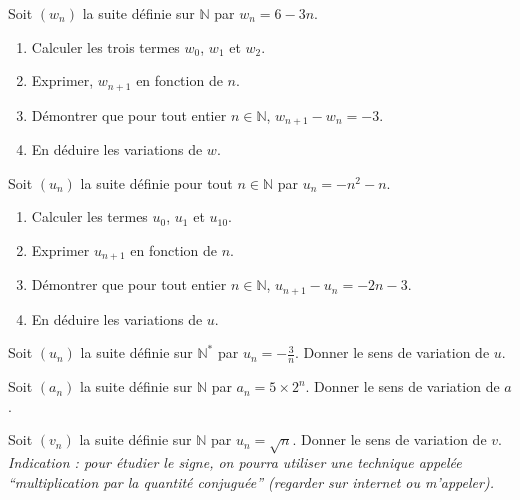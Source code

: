 \documentclass[11pt]{article}
\begin{document}
\noindent\begin{minipage}[]{.48\textwidth}
\begin{exo}
  Soit $(w_n)$ la suite définie sur $\mathbb{N}$ par $w_n = 6 - 3n$.
\begin{enumerate}
    \item Calculer les trois termes $w_0$, $w_1$ et $w_2$.
    \item Exprimer, $w_{n+1}$ en fonction de $n$.
    \item Démontrer que pour tout entier $n \in \mathbb{N}$, $w_{n+1} - w_n = -3$.
    \item En déduire les variations de $w$.
\end{enumerate}
\end{exo}
\end{minipage}
\hfill
\begin{minipage}[]{.48\textwidth}
\begin{exo}
  Soit $(u_n)$ la suite définie pour tout $n \in \mathbb{N}$ par $u_n = -n^2-n$.
\begin{enumerate}
    \item Calculer les termes $u_0$, $u_1$ et $u_{10}$.
    \item Exprimer $u_{n+1}$ en fonction de $n$.
    \item Démontrer que pour tout entier $n \in \mathbb{N}$, $u_{n+1} - u_n = -2n
      -3$.
    \item En déduire les variations de $u$.
\end{enumerate}
\end{exo}
\end{minipage}

\begin{exo}
  Soit $(u_n)$ la suite définie sur $\mathbb{N^*}$ par $u_n=-\frac{3}{n}$. Donner
  le sens de variation de $u$.
\end{exo}

\begin{exo}
  Soit $(a_n)$ la suite définie sur $\mathbb{N}$ par $a_n=5\times2^n$. Donner
  le sens de variation de $a$.
\end{exo}

\begin{exo}[$\star$]
  Soit $(v_n)$ la suite définie sur $\mathbb{N}$ par $u_n=\sqrt{n}$. Donner
  le sens de variation de $v$. \emph{Indication : pour étudier le signe, on
  pourra utiliser une technique appelée ``multiplication par la quantité
  conjuguée'' (regarder sur internet ou m'appeler).}
\end{exo}
\end{document}
